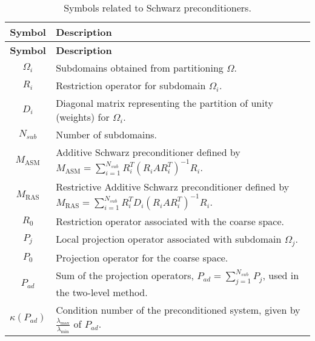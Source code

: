 \begin{longtable}{c p{10cm}}
    \caption{Symbols related to Schwarz preconditioners.}\label{tab:schwarz_symbols}                                                                    \\
    \hline
    \textbf{Symbol}  & \textbf{Description}                                                                                                             \\
    \hline
    \endfirsthead

    \hline
    \textbf{Symbol}  & \textbf{Description}                                                                                                             \\
    \hline
    \endhead

    \hline
    \endfoot

    \hline
    \endlastfoot

    $\Omega_i$       & Subdomains obtained from partitioning $\Omega$.                                                                                  \\
    $R_i$            & Restriction operator for subdomain $\Omega_i$.                                                                                   \\
    $D_i$            & Diagonal matrix representing the partition of unity (weights) for $\Omega_i$.                                                    \\
    $N_{sub}$        & Number of subdomains.                                                                                                            \\
    $M_{\text{ASM}}$ & Additive Schwarz preconditioner defined by $M_{\text{ASM}} = \sum_{i=1}^{N_{sub}} R_i^T (R_i A R_i^T)^{-1} R_i$.                 \\
    $M_{\text{RAS}}$ & Restrictive Additive Schwarz preconditioner defined by $M_{\text{RAS}} = \sum_{i=1}^{N_{sub}} R_i^T D_i (R_i A R_i^T)^{-1} R_i$. \\
    $R_0$            & Restriction operator associated with the coarse space.                                                                           \\
    $P_j$            & Local projection operator associated with subdomain $\Omega_j$.                                                                  \\
    $P_0$            & Projection operator for the coarse space.                                                                                        \\
    $P_{ad}$         & Sum of the projection operators, $P_{ad} = \sum_{j=1}^{N_{sub}} P_j$, used in the two-level method.                              \\
    $\kappa(P_{ad})$ & Condition number of the preconditioned system, given by $\frac{\lambda_{\max}}{\lambda_{\min}}$ of $P_{ad}$.                     \\
\end{longtable}


